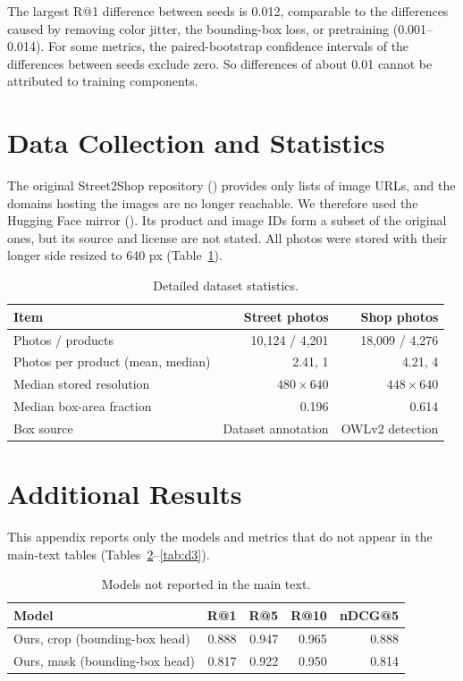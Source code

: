 \documentclass[sigconf,nonacm]{acmart}
\begin{document}
The largest R@1 difference between seeds is 0.012, comparable to the differences caused by removing color jitter, the bounding-box loss, or pretraining (0.001--0.014). For some metrics, the paired-bootstrap confidence intervals of the differences between seeds exclude zero. So differences of about 0.01 cannot be attributed to training components.

\section{Data Collection and Statistics}
\label{app:data}

The original Street2Shop repository () provides only lists of image URLs, and the domains hosting the images are no longer reachable. We therefore used the Hugging Face mirror (). Its product and image IDs form a subset of the original ones, but its source and license are not stated. All photos were stored with their longer side resized to 640 px (Table~\ref{tab:stats}).

\begin{table}[ht]
  \caption{Detailed dataset statistics.}
  \label{tab:stats}
  \footnotesize
  \setlength{\tabcolsep}{3pt}
  \begin{tabular}{lrr}
    \toprule
    Item & Street photos & Shop photos \\
    \midrule
    Photos / products & 10,124 / 4,201 & 18,009 / 4,276 \\
    Photos per product (mean, median) & 2.41, 1 & 4.21, 4 \\
    Median stored resolution & $480\times640$ & $448\times640$ \\
    Median box-area fraction & 0.196 & 0.614 \\
    Box source & Dataset annotation & OWLv2 detection \\
    \bottomrule
  \end{tabular}
\end{table}

\section{Additional Results}
\label{app:extra}

This appendix reports only the models and metrics that do not appear in the main-text tables (Tables~\ref{tab:d1}--\ref{tab:d3}).

\begin{table}[ht]
  \caption{Models not reported in the main text.}
  \label{tab:d1}
  \small
  \setlength{\tabcolsep}{3pt}
  \begin{tabular}{lrrrr}
    \toprule
    Model & R@1 & R@5 & R@10 & nDCG@5 \\
    \midrule
    Ours, crop (bounding-box head) & 0.888 & 0.947 & 0.965 & 0.888 \\
    Ours, mask (bounding-box head) & 0.817 & 0.922 & 0.950 & 0.814 \\
    \bottomrule
  \end{tabular}
\end{table}
\end{document}
